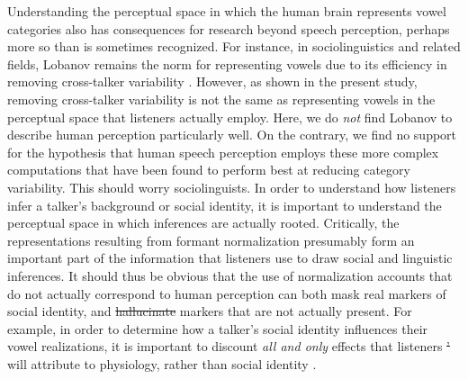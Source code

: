 \documentclass[preprint]{JASA}
\providecommand{\DIFadd}[1]{{\protect\color{blue}\uwave{#1}}} %
\providecommand{\DIFdel}[1]{{\protect\color{red}\sout{#1}}}                      %
\providecommand{\DIFaddbegin}{} %
\providecommand{\DIFaddend}{} %
\providecommand{\DIFdelbegin}{} %
\providecommand{\DIFdelend}{} %
\begin{document}
Understanding the perceptual space in which the human brain represents vowel categories also has consequences for research beyond speech perception, perhaps more so than is sometimes recognized. For instance, in sociolinguistics and related fields, Lobanov remains the norm for representing vowels due to its efficiency in removing cross-talker variability \citep[for review, see][]{adank2004, barreda2021}. However, as shown in the present study, removing cross-talker variability is not the same as representing vowels in the perceptual space that listeners actually employ. Here, we do \emph{not} find Lobanov to describe human perception particularly well. On the contrary, we find no support for the hypothesis that human speech perception employs these more complex computations that have been found to perform best at reducing category variability. This should worry sociolinguists. In order to understand how listeners infer a talker's background or social identity, it is important to understand the perceptual space in which inferences are actually rooted. Critically, the representations resulting from formant normalization presumably form an important part of the information that listeners use to draw social and linguistic inferences. It should thus be obvious that the use of normalization accounts that do not actually correspond to human perception can both mask real markers of social identity, and \DIFdelbegin \DIFdel{hallucinate }\DIFdelend \DIFaddbegin \DIFadd{`hallucinate' }\DIFaddend markers that are not actually present. For example, in order to determine how a talker's social identity influences their vowel realizations, it is important to discount \emph{all and only} effects that listeners \DIFdelbegin \DIFdel{' }\DIFdelend will attribute to physiology, rather than social identity \citep{disner1980, hindle1978}.
\end{document}
